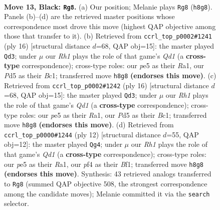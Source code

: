 \documentclass[11pt]{article}
\begin{document}
\clearpage

\begin{figure}[p]\centering
\begin{subfigure}{0.46\textwidth}\centering
\resizebox{\linewidth}{!}{%
\newchessgame
\chessboard[
  setfen={rnbqkb1r/p4ppp/2p1p3/2PpP3/P4PPP/2P5/1P1N4/R1BQK1NR b KQq - 0 13},
  showmover=false,
  pgfstyle=straightmove, color=movearrow, markmove={h8-g8}
]}
\caption{}
\end{subfigure}\hfill
\begin{subfigure}{0.46\textwidth}\centering
\resizebox{\linewidth}{!}{%
\newchessgame
\chessboard[
  setfen={rnb1k2r/ppq1nppp/4p3/2p5/2BP4/P1P1P3/5PPP/R1BQK1NR w KQkq - 1 9},
  showmover=false,
  pgfstyle=straightmove, color=movearrow, markmove={d1-d3}
]}
\caption{}
\end{subfigure}
\\[4pt]
\begin{subfigure}{0.46\textwidth}\centering
\resizebox{\linewidth}{!}{%
\newchessgame
\chessboard[
  setfen={rnb1k2r/ppq1nppp/4p3/2p5/2BP4/P1P1P3/5PPP/R1BQK1NR w KQkq - 1 9},
  showmover=false,
  pgfstyle=straightmove, color=movearrow, markmove={d1-d3}
]}
\caption{}
\end{subfigure}\hfill
\begin{subfigure}{0.46\textwidth}\centering
\resizebox{\linewidth}{!}{%
\newchessgame
\chessboard[
  setfen={rnbqk2r/pp2nppp/4p3/2ppP3/3P4/P1P5/2P2PPP/R1BQKBNR w KQkq - 1 7},
  showmover=false,
  pgfstyle=straightmove, color=movearrow, markmove={d1-g4}
]}
\caption{}
\end{subfigure}
\caption{\textbf{Move 13, Black: \texttt{Rg8}.} (a) Our position; Melanie plays \texttt{Rg8} (\texttt{h8g8}). Panels (b)--(d) are the retrieved master positions whose correspondence most drove this move (highest QAP objective among those that transfer to it). (b) Retrieved from \texttt{ccrl\_top\_p0002\#1241} (ply 16) [structural distance $d$=68, QAP obj=15]: the master played \texttt{Qd3}; under $\mu$ our \emph{Rh1} plays the role of that game's \emph{Qd1} (a \textbf{cross-type} correspondence); cross-type roles: our \emph{p}e5 as their \emph{R}a1, our \emph{P}d5 as their \emph{B}c1; transferred move \texttt{h8g8} \textbf{(endorses this move)}. (c) Retrieved from \texttt{ccrl\_top\_p0002\#1242} (ply 16) [structural distance $d$=68, QAP obj=15]: the master played \texttt{Qd3}; under $\mu$ our \emph{Rh1} plays the role of that game's \emph{Qd1} (a \textbf{cross-type} correspondence); cross-type roles: our \emph{p}e5 as their \emph{R}a1, our \emph{P}d5 as their \emph{B}c1; transferred move \texttt{h8g8} \textbf{(endorses this move)}. (d) Retrieved from \texttt{ccrl\_top\_p0000\#1244} (ply 12) [structural distance $d$=55, QAP obj=12]: the master played \texttt{Qg4}; under $\mu$ our \emph{Rh1} plays the role of that game's \emph{Qd1} (a \textbf{cross-type} correspondence); cross-type roles: our \emph{p}e5 as their \emph{R}a1, our \emph{p}f4 as their \emph{B}f1; transferred move \texttt{h8g8} \textbf{(endorses this move)}. Synthesis: 43 retrieved analogs transferred to \texttt{Rg8} (summed QAP objective 508, the strongest correspondence among the candidate moves); Melanie committed it via the \texttt{search} selector.}
\label{fig:thought-m25}
\end{figure}
\end{document}
